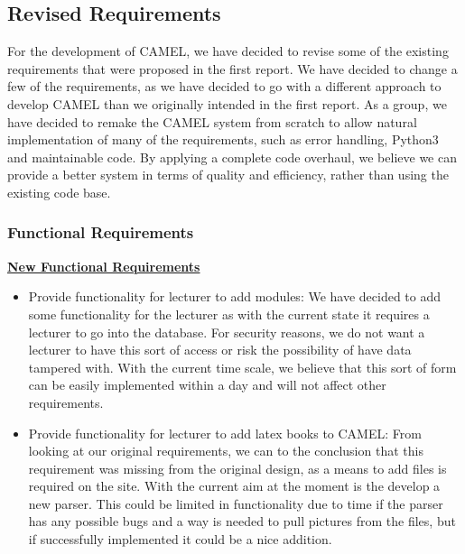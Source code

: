 \subsection*{Revised Requirements}
	For the development of CAMEL, we have decided to revise some of the existing requirements that were proposed in the first report. We have decided to change a few of the requirements, as we have decided to go with a different approach to develop CAMEL than we originally intended in the first report. As a group, we have decided to remake the CAMEL system from scratch to allow natural implementation of many of the requirements, such as error handling, Python3 and maintainable code. By applying a complete code overhaul, we believe we can provide a better system in terms of quality and efficiency, rather than using the existing code base.\\    
	
	\subsubsection*{Functional Requirements}
	\underline{\textbf{New Functional Requirements}}
	\begin{itemize}
		\item Provide functionality for lecturer to add modules: We have decided to add some functionality for the lecturer as with the current state it requires a lecturer to go into the database. For security reasons, we do not want a lecturer to have this sort of access or risk the possibility of have data tampered with. With the current time scale, we believe that this sort of form can be easily implemented within a day and will not affect other requirements. 
		
		\item Provide functionality for lecturer to add latex books to CAMEL: From looking at our original requirements, we can to the conclusion that this requirement was missing from the original design, as a means to add files is required on the site. With the current aim at the moment is the develop a new parser. This could be limited in functionality due to time if the parser has any possible bugs and a way is needed to pull pictures from the files, but if successfully implemented it could be a nice addition.
	\end{itemize}
	
